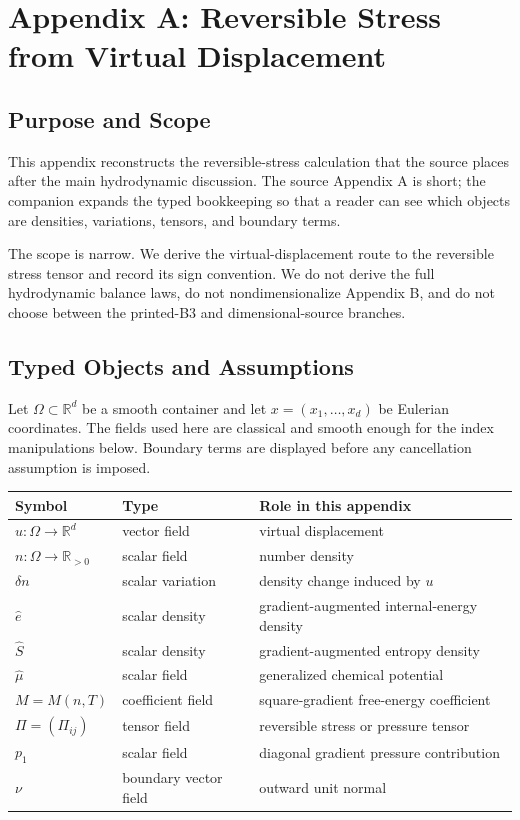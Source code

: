 \section{Appendix A: Reversible Stress from Virtual Displacement}
\label{app:reversible-stress-derivation}


\subsection{Purpose and Scope}

This appendix reconstructs the reversible-stress calculation that the source
places after the main hydrodynamic discussion.  The source Appendix A is short;
the companion expands the typed bookkeeping so that a reader can see which
objects are densities, variations, tensors, and boundary terms.

The scope is narrow.  We derive the virtual-displacement route to the
reversible stress tensor and record its sign convention.  We do not derive the
full hydrodynamic balance laws, do not nondimensionalize Appendix B, and do not
choose between the printed-B3 and dimensional-source branches.

\subsection{Typed Objects and Assumptions}

Let \(\Omega\subset\mathbb{R}^d\) be a smooth container and let
\(x=(x_1,\ldots,x_d)\) be Eulerian coordinates.  The fields used here are
classical and smooth enough for the index manipulations below.  Boundary terms
are displayed before any cancellation assumption is imposed.

\begin{center}
\begin{tabular}{@{}lll@{}}
\toprule
Symbol & Type & Role in this appendix \\
\midrule
\(u:\Omega\to\mathbb{R}^d\) & vector field & virtual displacement \\
\(n:\Omega\to\mathbb{R}_{>0}\) & scalar field & number density \\
\(\delta n\) & scalar variation & density change induced by \(u\) \\
\(\hat e\) & scalar density & gradient-augmented internal-energy density \\
\(\hat S\) & scalar density & gradient-augmented entropy density \\
\(\hat\mu\) & scalar field & generalized chemical potential \\
\(M=M(n,T)\) & coefficient field & square-gradient free-energy coefficient \\
\(\Pi=(\Pi_{ij})\) & tensor field & reversible stress or pressure tensor \\
\(p_1\) & scalar field & diagonal gradient pressure contribution \\
\(\nu\) & boundary vector field & outward unit normal \\
\bottomrule
\end{tabular}
\end{center}

